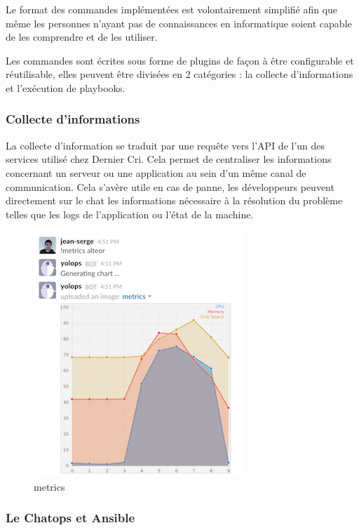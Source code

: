 \documentclass[12pt,a4paper]{article}
\begin{document}
  \bigskip

  Le format des commandes implémentées est volontairement simplifié afin
  que même les personnes n'ayant pas de connaissances en informatique
  soient capable de les comprendre et de les utiliser. \bigskip

  Les commandes sont écrites sous forme de plugins de façon à être
  configurable et réutilisable, elles peuvent être divisées en 2
  catégories : la collecte d'informations et l'exécution de playbooks.

  \newpage

  \subsubsection{Collecte d'informations}\label{collecte-dinformations}

  \bigskip

  La collecte d'information se traduit par une requête vers l'API de l'un
  des services utilisé chez Dernier Cri. Cela permet de centraliser les
  informations concernant un serveur ou une application au sein d'un même
  canal de communication. Cela s'avère utile en cas de panne, les
  développeurs peuvent directement sur le chat les informations nécessaire
  à la résolution du problème telles que les logs de l'application ou
  l'état de la machine.

  \begin{figure}[htbp]
  \centering
  \includegraphics{metrics.png}
  \caption{metrics}
  \end{figure}

  \newpage

  \subsubsection{Le Chatops et Ansible}\label{le-chatops-et-ansible}
\end{document}
